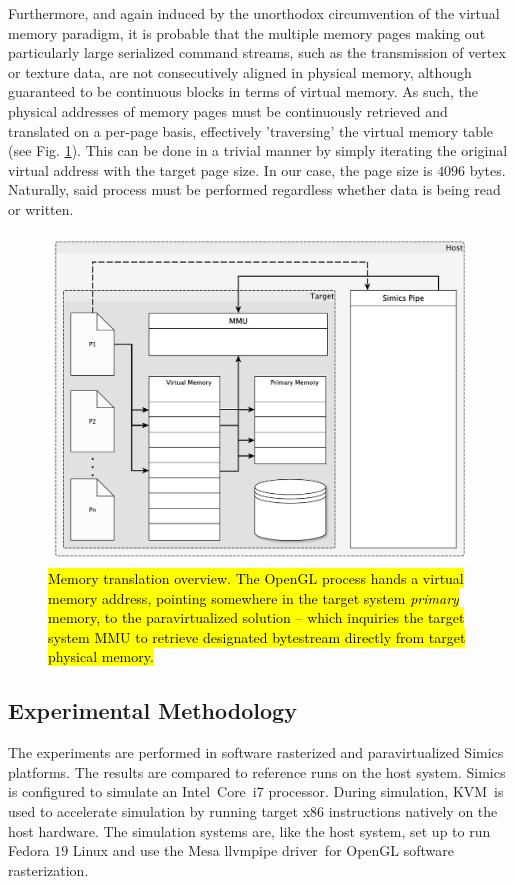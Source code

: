 Furthermore, and again induced by the unorthodox circumvention of the virtual memory paradigm, it is probable that the multiple memory pages making out particularly large serialized command streams, such as the transmission of vertex or texture data, are not consecutively aligned in physical memory, although guaranteed to be continuous blocks in terms of virtual memory.
As such, the physical addresses of memory pages must be continuously retrieved and translated on a per-page basis, effectively 'traversing' the virtual memory table (see Fig. \ref{fig:virtualmemory}).
This can be done in a trivial manner by simply iterating the original virtual address with the target page size.
In our case, the page size is $4096$ bytes.
Naturally, said process must be performed regardless whether data is being read or written.

\begin{figure}
\centering
\includegraphics[width=\linewidth]{img/yedvirtualmemory.pdf}
\caption[Memory translation overview]{\hl{Memory translation overview. The OpenGL process hands a virtual memory address, pointing somewhere in the target system \textit{primary} memory, to the paravirtualized solution -- which inquiries the target system MMU to retrieve designated bytestream directly from target physical memory.}}
\label{fig:virtualmemory}
\end{figure}

\subsection{Experimental Methodology}
\label{sec:experimentalmethodology}
The experiments are performed in software rasterized and paravirtualized Simics platforms.
The results are compared to reference runs on the host system.
Simics is configured to simulate an Intel\circledR ~Core\texttrademark ~i7 processor.
During simulation, KVM\ is used to  accelerate simulation by running target x86 instructions natively on the host hardware.
The simulation systems are, like the host system, set up to run Fedora $19$ Linux and use the Mesa llvmpipe driver\ for OpenGL software rasterization.

